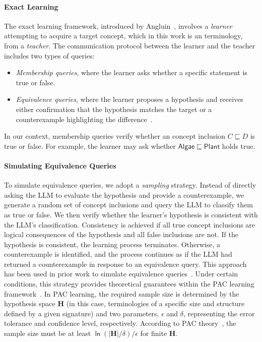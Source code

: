 \paragraph{Exact Learning}
The exact learning framework, introduced by Angluin~\cite{DBLP:journals/ml/Angluin87}, involves a \emph{learner} attempting to acquire a target concept, which in this work is an \EL terminology, from a \emph{teacher}.
%
The communication protocol between the learner and the teacher includes two types of queries:
%
\begin{itemize}
    \item \emph{Membership queries}, where the learner asks whether a specific statement is true or false.
    \item \emph{Equivalence queries}, where the learner proposes a hypothesis and receives either confirmation that the hypothesis matches the target or a counterexample highlighting the difference~\cite{DBLP:journals/ml/Angluin87}.
\end{itemize}
%
In our context, membership queries verify whether an \EL concept inclusion \(C \sqsubseteq D\) is true or false.
%
For example, the learner may ask whether \(\mathsf{Algae} \sqsubseteq \mathsf{Plant}\) holds true.


\paragraph{Simulating Equivalence Queries}
To simulate equivalence queries, we adopt a \emph{sampling} strategy.
%
Instead of directly asking the \gls{LLM} to evaluate the hypothesis and provide a counterexample, we generate a random set of \EL concept inclusions and query the \gls{LLM} to classify them as true or false.
%
We then verify whether the learner's hypothesis is consistent with the \gls{LLM}'s classification.
%
Consistency is achieved if all true concept inclusions are logical consequences of the hypothesis and all false inclusions are not.
%
If the hypothesis is consistent, the learning process terminates.
%
Otherwise, a counterexample is identified, and the process continues as if the \gls{LLM} had returned a counterexample in response to an equivalence query.
%
This approach has been used in prior work to simulate equivalence queries~\cite{DBLP:journals/ml/WeissGY24,DBLP:journals/ijar/BlumKOT24}.
%
Under certain conditions, this strategy provides theoretical guarantees within the \gls{PAC} learning framework~\cite{DBLP:journals/ml/Angluin87,DBLP:journals/cacm/Valiant84}.
%
In \gls{PAC} learning, the required sample size is determined by the hypothesis space \(\mathbf{H}\) (in this case, \EL terminologies of a specific size and structure defined by a given signature) and two parameters, \(\epsilon\) and \(\delta\), representing the error tolerance and confidence level, respectively.
%
According to \gls{PAC} theory~\cite[Cor. 2.3]{DBLP:books/daglib/0033642}, the sample size must be at least \(\mathsf{\ln}(|\mathbf{H}|/\delta)/\epsilon\) for finite \(\mathbf{H}\).


